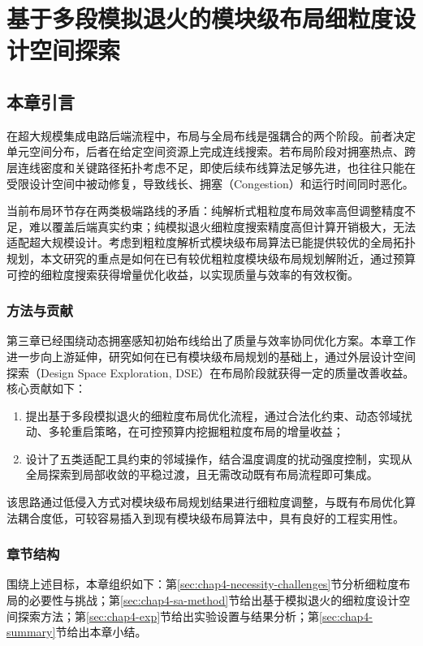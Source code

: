 \chapter{基于多段模拟退火的模块级布局细粒度设计空间探索}
\label{cha:chap4-sa-dse}

\section{本章引言}
\label{sec:chap4-background}

在超大规模集成电路后端流程中，布局与全局布线是强耦合的两个阶段。前者决定单元空间分布，后者在给定空间资源上完成连线搜索。若布局阶段对拥塞热点、跨层连线密度和关键路径拓扑考虑不足，即使后续布线算法足够先进，也往往只能在受限设计空间中被动修复，导致线长、拥塞（Congestion）和运行时间同时恶化。

当前布局环节存在两类极端路线的矛盾：纯解析式粗粒度布局效率高但调整精度不足，难以覆盖后端真实约束；纯模拟退火细粒度搜索精度高但计算开销极大，无法适配超大规模设计。考虑到粗粒度解析式模块级布局算法已能提供较优的全局拓扑规划，本文研究的重点是如何在已有较优粗粒度模块级布局规划解附近，通过预算可控的细粒度搜索获得增量优化收益，以实现质量与效率的有效权衡。

\subsection{方法与贡献}
第三章已经围绕动态拥塞感知初始布线给出了质量与效率协同优化方案。本章工作进一步向上游延伸，研究如何在已有模块级布局规划的基础上，通过外层设计空间探索（Design Space Exploration, DSE）在布局阶段就获得一定的质量改善收益。核心贡献如下：
\begin{enumerate}
    \item 提出基于多段模拟退火的细粒度布局优化流程，通过合法化约束、动态邻域扰动、多轮重启策略，在可控预算内挖掘粗粒度布局的增量收益；
    \item 设计了五类适配工具约束的邻域操作，结合温度调度的扰动强度控制，实现从全局探索到局部收敛的平稳过渡，且无需改动既有布局流程即可集成。
\end{enumerate}

该思路通过低侵入方式对模块级布局规划结果进行细粒度调整，与既有布局优化算法耦合度低，可较容易插入到现有模块级布局算法中，具有良好的工程实用性。

\subsection{章节结构}
围绕上述目标，本章组织如下：第\ref{sec:chap4-necessity-challenges}节分析细粒度布局的必要性与挑战；第\ref{sec:chap4-sa-method}节给出基于模拟退火的细粒度设计空间探索方法；第\ref{sec:chap4-exp}节给出实验设置与结果分析；第\ref{sec:chap4-summary}节给出本章小结。

